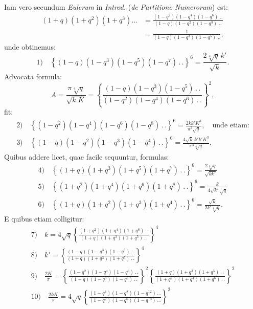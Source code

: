 \documentclass{article}
\begin{document}
Iam vero secundum \emph{Eulerum} in \emph{Introd.} (\emph{de Partitione Numerorum}) est:
\[
\begin{aligned}
(1+q)(1+q^{2})(1+q^{3})\ldots&=\frac{(1-q^{2})(1-q^{4})(1-q^{6})\ldots}{(1-q)(1-q^{2})(1-q^{3})\ldots}\\[2ex]
&=\frac{1}{(1-q)(1-q^{3})(1-q^{5})\ldots},
\end{aligned}
\]
unde obtinemus:
\[
\text{1)}\quad\left\{(1-q)(1-q^{3})(1-q^{5})(1-q^{7})\,.\,.\right\}^{6}=\frac{2\sqrt[4]{q}\,k'}{\sqrt{k}}.
\]
Advocata formula:
\[
A=\frac{\pi\sqrt[4]{q}}{\sqrt{k.K}}=\left\{\frac{(1-q)(1-q^{3})(1-q^{5})\,.\,.}{(1-q^{2})(1-q^{4})(1-q^{6})\,.\,.}\right\}^{2},
\]
fit:
\[
\begin{gathered}
\text{2)}\quad\left\{(1-q^{2})(1-q^{4})(1-q^{6})(1-q^{8})\,.\,.\right\}^{6}=\frac{2kk'K^{3}}{\pi^{3}\sqrt{q}},\quad\text{unde etiam:}
\\[2ex]
\text{3)}\quad\left\{(1-q)(1-q^{2})(1-q^{3})(1-q^{4})\,.\,.\right\}^{6}=\frac{4\sqrt{k}\,k'k'K^{3}}{\pi^{3}\sqrt[4]{q}}.
\end{gathered}
\]
Quibus addere licet, quae facile sequuntur, formulas:
\[
\begin{gathered}
\text{4)}\quad\left\{(1+q)(1+q^{3})(1+q^{5})(1+q^{7})\,.\,.\right\}^{6}=\frac{2\sqrt[4]{q}}{\sqrt{kk'}}
\\[2ex]
\text{5)}\quad\left\{(1+q^{2})(1+q^{4})(1+q^{6})(1+q^{8})\,.\,.\right\}^{6}=\frac{k}{4\sqrt{k'}\sqrt{q}}
\\[2ex]
\text{6)}\quad\left\{(1+q)(1+q^{2})(1+q^{3})(1+q^{4})\,.\,.\right\}^{6}=\frac{\sqrt{k}}{2k'\sqrt[4]{q}}.
\end{gathered}
\]
E quibus etiam colligitur:
\[
\begin{gathered}
\text{7)}\quad k=4\sqrt{q}\left\{\frac{(1+q^{2})(1+q^{4})(1+q^{6})\,.\,.}{(1+q)(1+q^{3})(1+q^{5})\,.\,.}\right\}^{4}
\\[2ex]
\text{8)}\quad k'=\left\{\frac{(1-q)(1-q^{3})(1-q^{5})\,.\,.}{(1+q)(1+q^{3})(1+q^{5})\,.\,.}\right\}^{4}
\\[2ex]
\text{9)}\quad\frac{2K}{\pi}=\left\{\frac{(1-q^{2})(1-q^{4})(1-q^{6})\,.\,.}{(1-q)(1-q^{3})(1-q^{5})\,.\,.}\right\}^{2}\left\{\frac{(1+q)(1+q^{3})(1+q^{5})\,.\,.}{(1+q^{2})(1+q^{4})(1+q^{6})\,.\,.}\right\}^{2}
\\[2ex]
\text{10)}\quad\frac{2kK}{\pi}=4\sqrt{q}\left\{\frac{(1-q^{4})(1-q^{8})(1-q^{12})\,.\,.}{(1-q^{2})(1-q^{6})(1-q^{10})\,.\,.}\right\}^{2}
\end{gathered}
\]
\end{document}
